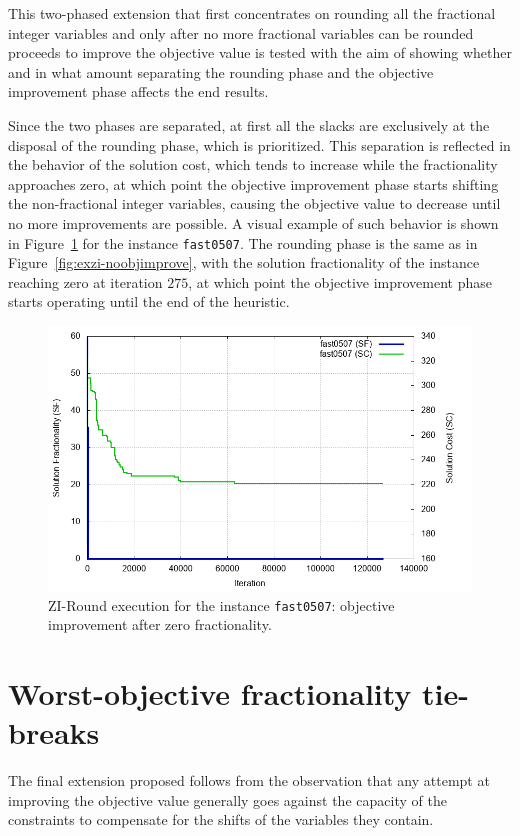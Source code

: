 \documentclass[a4paper,12pt]{book}
\begin{document}
This two-phased extension that first concentrates on rounding all the fractional integer variables and only after no more fractional variables can be rounded proceeds to improve the objective value is tested with the aim of showing whether and in what amount separating the rounding phase and the objective improvement phase affects the end results. \par 

Since the two phases are separated, at first all the slacks are exclusively at the disposal of the rounding phase, which is prioritized. This separation is reflected in the behavior of the solution cost, which tends to increase while the fractionality approaches zero, at which point the objective improvement phase starts shifting the non-fractional integer variables, causing the objective value to decrease until no more improvements are possible. A visual example of such behavior is shown in Figure~\ref{fig:exzi-objimproveafter0frac} for the instance \texttt{fast0507}. The rounding phase is the same as in Figure~\ref{fig:exzi-noobjimprove}, with the solution fractionality of the instance reaching zero at iteration $275$, at which point the objective improvement phase starts operating until the end of the heuristic.
\begin{figure}[ht]
	\centering
	\includegraphics[width=\textwidth]{fast0507-shiftnfafter0frac.png}
	\caption{ZI-Round execution for the instance \texttt{fast0507}: objective improvement after zero fractionality.}
	\label{fig:exzi-objimproveafter0frac}
\end{figure}

\section{Worst-objective fractionality tie-breaks}
The final extension proposed follows from the observation that any attempt at improving the objective value generally goes against the capacity of the constraints to compensate for the shifts of the variables they contain. \par 
\end{document}
